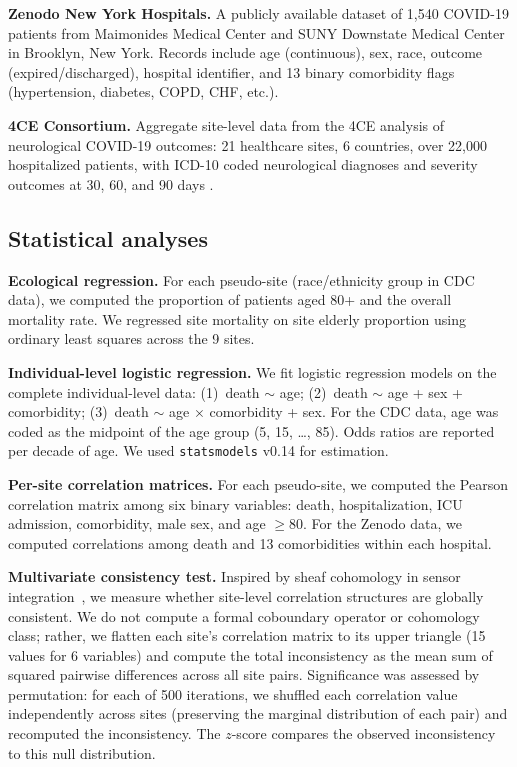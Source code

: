 \documentclass{article}
\begin{document}
\textbf{Zenodo New York Hospitals.}  A publicly available dataset of 1,540
COVID-19 patients from Maimonides Medical Center and SUNY Downstate Medical
Center in Brooklyn, New York.  Records include age (continuous), sex,
race, outcome (expired/discharged), hospital identifier, and 13 binary
comorbidity flags (hypertension, diabetes, COPD, CHF, etc.).

\textbf{4CE Consortium.}  Aggregate site-level data from the 4CE analysis
of neurological COVID-19 outcomes: 21 healthcare sites, 6 countries, over
22,000 hospitalized patients, with ICD-10 coded neurological diagnoses and
severity outcomes at 30, 60, and 90 days \cite{four_ce_neuro2021}.

\subsection{Statistical analyses}

\textbf{Ecological regression.}  For each pseudo-site (race/ethnicity group
in CDC data), we computed the proportion of patients aged 80+ and the overall
mortality rate.  We regressed site mortality on site elderly proportion using
ordinary least squares across the 9 sites.

\textbf{Individual-level logistic regression.}  We fit logistic regression
models on the complete individual-level data: (1)~death $\sim$ age; (2)~death
$\sim$ age + sex + comorbidity; (3)~death $\sim$ age $\times$ comorbidity +
sex.  For the CDC data, age was coded as the midpoint of the age group (5, 15,
\ldots, 85).  Odds ratios are reported per decade of age.  We used
\texttt{statsmodels} v0.14 for estimation.

\textbf{Per-site correlation matrices.}  For each pseudo-site, we computed the
Pearson correlation matrix among six binary variables: death, hospitalization,
ICU admission, comorbidity, male sex, and age $\geq 80$.  For the Zenodo data,
we computed correlations among death and 13 comorbidities within each hospital.

\textbf{Multivariate consistency test.}  Inspired by sheaf cohomology in sensor
integration~\cite{robinson2017sheaf}, we measure whether site-level
correlation structures are globally consistent.  We do not compute a formal
coboundary operator or cohomology class; rather, we flatten each site's
correlation matrix to its upper triangle (15 values for 6 variables) and
compute the total inconsistency as the mean sum of squared pairwise
differences across all site pairs.  Significance was assessed by permutation:
for each of 500 iterations, we shuffled each correlation value independently
across sites (preserving the marginal distribution of each pair) and
recomputed the inconsistency.  The $z$-score compares the observed
inconsistency to this null distribution.
\end{document}
